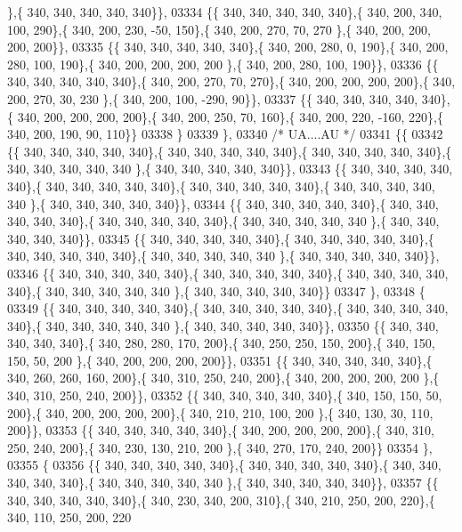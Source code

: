 \begin{DoxyCode}
      \},\{ 340, 340, 340, 340, 340\}\},
03334 \{\{ 340, 340, 340, 340, 340\},\{ 340, 200, 340, 100, 290\},\{ 340, 200, 230, -50, 150\},\{ 340, 200, 270,  70, 270
      \},\{ 340, 200, 200, 200, 200\}\},
03335 \{\{ 340, 340, 340, 340, 340\},\{ 340, 200, 280,   0, 190\},\{ 340, 200, 280, 100, 190\},\{ 340, 200, 200, 200, 200
      \},\{ 340, 200, 280, 100, 190\}\},
03336 \{\{ 340, 340, 340, 340, 340\},\{ 340, 200, 270,  70, 270\},\{ 340, 200, 200, 200, 200\},\{ 340, 200, 270,  30, 230
      \},\{ 340, 200, 100, -290,  90\}\},
03337 \{\{ 340, 340, 340, 340, 340\},\{ 340, 200, 200, 200, 200\},\{ 340, 200, 250,  70, 160\},\{ 340, 200, 220, -160, 
      220\},\{ 340, 200, 190,  90, 110\}\}
03338 \}
03339 \},
03340 \textcolor{comment}{/* UA....AU */}
03341 \{\{
03342 \{\{ 340, 340, 340, 340, 340\},\{ 340, 340, 340, 340, 340\},\{ 340, 340, 340, 340, 340\},\{ 340, 340, 340, 340, 340
      \},\{ 340, 340, 340, 340, 340\}\},
03343 \{\{ 340, 340, 340, 340, 340\},\{ 340, 340, 340, 340, 340\},\{ 340, 340, 340, 340, 340\},\{ 340, 340, 340, 340, 340
      \},\{ 340, 340, 340, 340, 340\}\},
03344 \{\{ 340, 340, 340, 340, 340\},\{ 340, 340, 340, 340, 340\},\{ 340, 340, 340, 340, 340\},\{ 340, 340, 340, 340, 340
      \},\{ 340, 340, 340, 340, 340\}\},
03345 \{\{ 340, 340, 340, 340, 340\},\{ 340, 340, 340, 340, 340\},\{ 340, 340, 340, 340, 340\},\{ 340, 340, 340, 340, 340
      \},\{ 340, 340, 340, 340, 340\}\},
03346 \{\{ 340, 340, 340, 340, 340\},\{ 340, 340, 340, 340, 340\},\{ 340, 340, 340, 340, 340\},\{ 340, 340, 340, 340, 340
      \},\{ 340, 340, 340, 340, 340\}\}
03347 \},
03348 \{
03349 \{\{ 340, 340, 340, 340, 340\},\{ 340, 340, 340, 340, 340\},\{ 340, 340, 340, 340, 340\},\{ 340, 340, 340, 340, 340
      \},\{ 340, 340, 340, 340, 340\}\},
03350 \{\{ 340, 340, 340, 340, 340\},\{ 340, 280, 280, 170, 200\},\{ 340, 250, 250, 150, 200\},\{ 340, 150, 150,  50, 200
      \},\{ 340, 200, 200, 200, 200\}\},
03351 \{\{ 340, 340, 340, 340, 340\},\{ 340, 260, 260, 160, 200\},\{ 340, 310, 250, 240, 200\},\{ 340, 200, 200, 200, 200
      \},\{ 340, 310, 250, 240, 200\}\},
03352 \{\{ 340, 340, 340, 340, 340\},\{ 340, 150, 150,  50, 200\},\{ 340, 200, 200, 200, 200\},\{ 340, 210, 210, 100, 200
      \},\{ 340, 130,  30, 110, 200\}\},
03353 \{\{ 340, 340, 340, 340, 340\},\{ 340, 200, 200, 200, 200\},\{ 340, 310, 250, 240, 200\},\{ 340, 230, 130, 210, 200
      \},\{ 340, 270, 170, 240, 200\}\}
03354 \},
03355 \{
03356 \{\{ 340, 340, 340, 340, 340\},\{ 340, 340, 340, 340, 340\},\{ 340, 340, 340, 340, 340\},\{ 340, 340, 340, 340, 340
      \},\{ 340, 340, 340, 340, 340\}\},
03357 \{\{ 340, 340, 340, 340, 340\},\{ 340, 230, 340, 200, 310\},\{ 340, 210, 250, 200, 220\},\{ 340, 110, 250, 200, 220

\end{DoxyCode}
